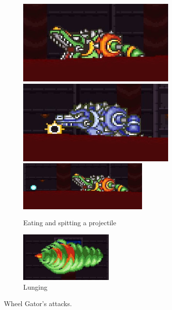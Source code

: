 \begin{figure}
	\ContinuedFloat
	\centering
	\begin{subfigure}{\linewidth}
		\centering
		\includegraphics[width=0.45\linewidth]{figures/X2/Wheel_gator/Gator_mouth.png}
		\includegraphics[width=0.45\linewidth]{figures/X2/Wheel_gator/Gator_absorb.png}
		\vspace{1pt}\\
		\includegraphics[height=2.5cm]{figures/X2/Wheel_gator/Gator_spit.png}
		\caption{Eating and spitting a projectile}
	\end{subfigure}
	\begin{subfigure}{0.8\linewidth}
		\centering
		\includegraphics[height=2.5cm]{figures/X2/Wheel_gator/Gator_DM.png}
		\caption{Lunging}
	\end{subfigure}
	\caption{Wheel Gator's attacks.}	
\end{figure}
